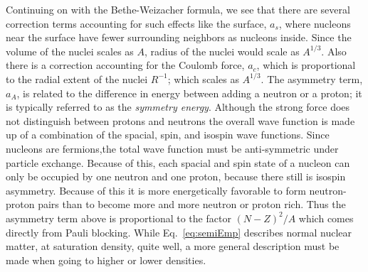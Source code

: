 Continuing on with the Bethe-Weizacher formula, we see that there are several correction terms accounting for such effects like the surface, $a_s$, where nucleons near the surface have fewer surrounding neighbors as nucleons inside. Since the volume of the nuclei scales as $A$, radius of the nuclei would scale as $A^{1/3}$. Also there is a correction accounting for the Coulomb force, $a_c$, which is proportional to the radial extent of the nuclei $R^{-1}$; which scales as $A^{1/3}$. The asymmetry term, $a_A$, is related to the difference in energy between adding a neutron or a proton; it is typically referred to as the \emph{symmetry energy}. Although the strong force does not distinguish between protons and neutrons the overall wave function is made up of a combination of the spacial, spin, and isospin wave functions. Since nucleons are fermions,the total wave function must be anti-symmetric under particle exchange. Because of this, each spacial and spin state of a nucleon can only be occupied by one neutron and one proton, because there still is isospin asymmetry.  Because of this it is more energetically favorable to form neutron-proton pairs than to become more and more neutron or proton rich. Thus the asymmetry term above is proportional to the factor $(N - Z)^2/A$ which comes directly from Pauli blocking. While Eq.~\ref{eq:semiEmp} describes normal nuclear matter, at saturation density, quite well, a more general description must be made when going to higher or lower densities. 


